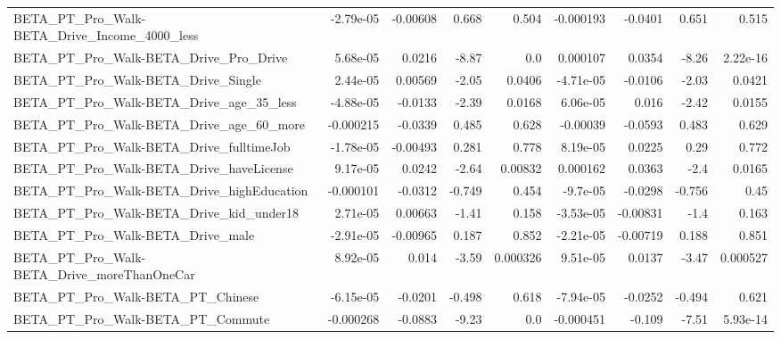 \begin{tabular}{lrrrrrrrr}
BETA\_PT\_Pro\_Walk-BETA\_Drive\_Income\_4000\_less       &   -2.79e-05 &     -0.00608 &     0.668 &    0.504 &  -0.000193 &     -0.0401 &        0.651 &         0.515 \\
BETA\_PT\_Pro\_Walk-BETA\_Drive\_Pro\_Drive              &    5.68e-05 &       0.0216 &     -8.87 &      0.0 &   0.000107 &      0.0354 &        -8.26 &      2.22e-16 \\
BETA\_PT\_Pro\_Walk-BETA\_Drive\_Single                 &    2.44e-05 &      0.00569 &     -2.05 &   0.0406 &  -4.71e-05 &     -0.0106 &        -2.03 &        0.0421 \\
BETA\_PT\_Pro\_Walk-BETA\_Drive\_age\_35\_less            &   -4.88e-05 &      -0.0133 &     -2.39 &   0.0168 &   6.06e-05 &       0.016 &        -2.42 &        0.0155 \\
BETA\_PT\_Pro\_Walk-BETA\_Drive\_age\_60\_more            &   -0.000215 &      -0.0339 &     0.485 &    0.628 &   -0.00039 &     -0.0593 &        0.483 &         0.629 \\
BETA\_PT\_Pro\_Walk-BETA\_Drive\_fulltimeJob            &   -1.78e-05 &     -0.00493 &     0.281 &    0.778 &   8.19e-05 &      0.0225 &         0.29 &         0.772 \\
BETA\_PT\_Pro\_Walk-BETA\_Drive\_haveLicense            &    9.17e-05 &       0.0242 &     -2.64 &  0.00832 &   0.000162 &      0.0363 &         -2.4 &        0.0165 \\
BETA\_PT\_Pro\_Walk-BETA\_Drive\_highEducation          &   -0.000101 &      -0.0312 &    -0.749 &    0.454 &   -9.7e-05 &     -0.0298 &       -0.756 &          0.45 \\
BETA\_PT\_Pro\_Walk-BETA\_Drive\_kid\_under18            &    2.71e-05 &      0.00663 &     -1.41 &    0.158 &  -3.53e-05 &    -0.00831 &         -1.4 &         0.163 \\
BETA\_PT\_Pro\_Walk-BETA\_Drive\_male                   &   -2.91e-05 &     -0.00965 &     0.187 &    0.852 &  -2.21e-05 &    -0.00719 &        0.188 &         0.851 \\
BETA\_PT\_Pro\_Walk-BETA\_Drive\_moreThanOneCar         &    8.92e-05 &        0.014 &     -3.59 & 0.000326 &   9.51e-05 &      0.0137 &        -3.47 &      0.000527 \\
BETA\_PT\_Pro\_Walk-BETA\_PT\_Chinese                   &   -6.15e-05 &      -0.0201 &    -0.498 &    0.618 &  -7.94e-05 &     -0.0252 &       -0.494 &         0.621 \\
BETA\_PT\_Pro\_Walk-BETA\_PT\_Commute                   &   -0.000268 &      -0.0883 &     -9.23 &      0.0 &  -0.000451 &      -0.109 &        -7.51 &      5.93e-14 \\

\end{tabular}
